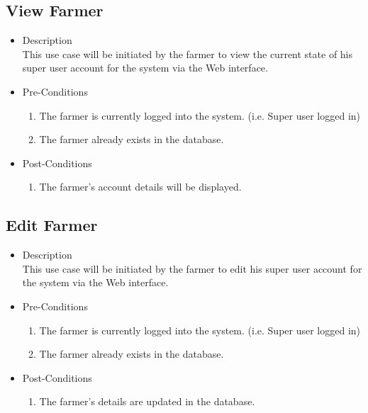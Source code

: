 \documentclass[11pt,fleqn]{book} %
\begin{document}
		\subsection{View Farmer}
			\begin{itemize}
				\item Description\\
				This use case will be initiated by the farmer to view the current state of his super user account for the system via the Web interface.
				\item Pre-Conditions
				\begin{enumerate}
					\item The farmer is currently logged into the system. (i.e. Super user logged in)
					\item The farmer already exists in the database.					
				\end{enumerate}
				\item Post-Conditions
				\begin{enumerate}
					\item The farmer’s account details will be displayed.
				\end{enumerate}
			\end{itemize}
			
		\subsection{Edit Farmer}
			\begin{itemize}
				\item Description\\
				This use case will be initiated by the farmer to edit his super user account for the system via the Web interface.
				\item Pre-Conditions
				\begin{enumerate}
					\item The farmer is currently logged into the system. (i.e. Super user logged in)
					\item The farmer already exists in the database.					
				\end{enumerate}
				\item Post-Conditions
				\begin{enumerate}
					\item The farmer’s details are updated in the database.
				\end{enumerate}
			\end{itemize}
			
\end{document}
